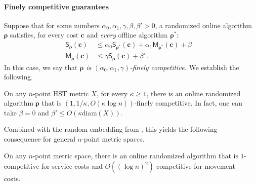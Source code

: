 \documentclass{toc}
\newcommand{\diam}{\mathrm{diam}}
\newcommand{\mcost}{\mathsf{M}}
\newcommand{\scost}{\mathsf{S}}
\begin{document}
\paragraph{Finely competitive guarantees}
Suppose that for some numbers $\alpha_0,\alpha_1,\gamma,\beta,\beta' > 0$,
a randomized online algorithm $\bm\rho$ satisfies, for every cost $\bm{c}$ and
\emph{every} offline algorithm $\bm{\rho}^*$:
\begin{align}
\scost_{\bm\rho}(\bm{c}) &\leq \alpha_0 \scost_{\bm\rho^*}(\bm{c}) + \alpha_1 \mcost_{\bm\rho^*}(\bm{c}) + \beta \label{eq:finesc}\\
\mcost_{\bm\rho}(\bm{c}) &\leq \gamma \scost_{\bm{\rho}}(\bm{c}) + \beta'\,.\label{eq:finemc}
\end{align}
In this case, we say that \emph{$\bm{\rho}$ is $(\alpha_0,\alpha_1,\gamma)$-finely competitive.}
We establish the following.

\begin{theorem}\label{thm:super}
	On any $n$-point HST metric $X$, for every $\kappa \geq 1$, there is an online randomized algorithm $\bm{\rho}$ that is
	$\left(1,1/\kappa,O(\kappa \log n)\right)$-finely competitive.
	In fact, one can take $\beta=0$ and $\beta' \leq O(\kappa \diam(X))$.
\end{theorem}

Combined with the random embedding from \cite{FRT04}, this yields the following consequence
for general $n$-point metric spaces.

\begin{corollary}
	On any $n$-point metric space, there is an online randomized algorithm that is
	$1$-competitive for service costs and $O((\log n)^2)$-competitive for movement costs.
\end{corollary}
\end{document}
